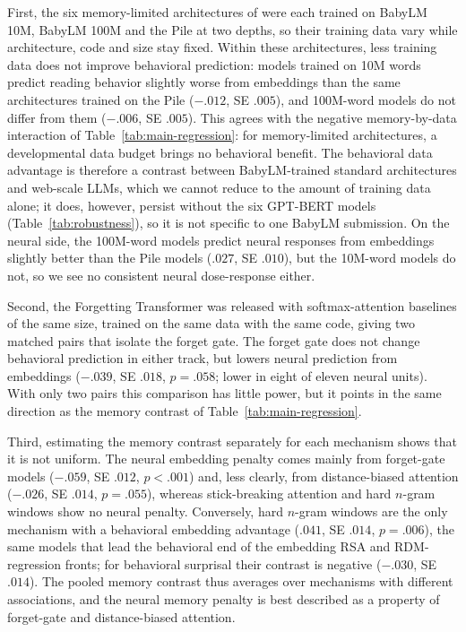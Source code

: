 First, the six memory-limited architectures of \citet{bu2026staticlinearattentionconstraints} were each trained on BabyLM 10M, BabyLM 100M and the Pile at two depths, so their training data vary while architecture, code and size stay fixed. Within these architectures, less training data does not improve behavioral prediction: models trained on 10M words predict reading behavior slightly worse from embeddings than the same architectures trained on the Pile ($-.012$, SE $.005$), and 100M-word models do not differ from them ($-.006$, SE $.005$). This agrees with the negative memory-by-data interaction of Table~\ref{tab:main-regression}: for memory-limited architectures, a developmental data budget brings no behavioral benefit. The behavioral data advantage is therefore a contrast between BabyLM-trained standard architectures and web-scale LLMs, which we cannot reduce to the amount of training data alone; it does, however, persist without the six GPT-BERT models (Table~\ref{tab:robustness}), so it is not specific to one BabyLM submission. On the neural side, the 100M-word models predict neural responses from embeddings slightly better than the Pile models ($.027$, SE $.010$), but the 10M-word models do not, so we see no consistent neural dose-response either.

Second, the Forgetting Transformer was released with softmax-attention baselines of the same size, trained on the same data with the same code, giving two matched pairs that isolate the forget gate. The forget gate does not change behavioral prediction in either track, but lowers neural prediction from embeddings ($-.039$, SE $.018$, $p=.058$; lower in eight of eleven neural units). With only two pairs this comparison has little power, but it points in the same direction as the memory contrast of Table~\ref{tab:main-regression}.

Third, estimating the memory contrast separately for each mechanism shows that it is not uniform. The neural embedding penalty comes mainly from forget-gate models ($-.059$, SE $.012$, $p<.001$) and, less clearly, from distance-biased attention ($-.026$, SE $.014$, $p=.055$), whereas stick-breaking attention and hard $n$-gram windows show no neural penalty. Conversely, hard $n$-gram windows are the only mechanism with a behavioral embedding advantage ($.041$, SE $.014$, $p=.006$), the same models that lead the behavioral end of the embedding RSA and RDM-regression fronts; for behavioral surprisal their contrast is negative ($-.030$, SE $.014$). The pooled memory contrast thus averages over mechanisms with different associations, and the neural memory penalty is best described as a property of forget-gate and distance-biased attention.

